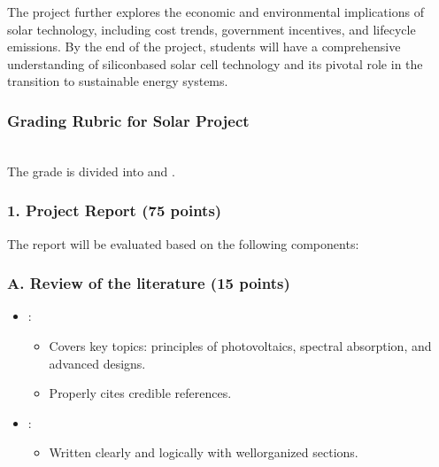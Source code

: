 \documentclass[letterpaper,10pt,english]{jupyterBook}
\begin{document}
\sphinxAtStartPar
The project further explores the economic and environmental implications
of solar technology, including cost trends, government incentives, and
lifecycle emissions. By the end of the project, students will have a
comprehensive understanding of silicon\sphinxhyphen{}based solar cell technology and
its pivotal role in the transition to sustainable energy systems.


\subsubsection{Grading Rubric for Solar Project}
\label{\detokenize{ProjectSyllabus:grading-rubric-for-solar-project}}
\sphinxAtStartPar
{}\\
The grade is divided into  and
.


\subsubsection{1. Project Report (75 points)}
\label{\detokenize{ProjectSyllabus:project-report-75-points}}
\sphinxAtStartPar
The report will be evaluated based on the following components:


\subsubsection{A. Review of the literature (15 points)}
\label{\detokenize{ProjectSyllabus:a-review-of-the-literature-15-points}}\begin{itemize}
\item {} 
\sphinxAtStartPar
{}:
\begin{itemize}
\item {} 
\sphinxAtStartPar
Covers key topics: principles of photovoltaics, spectral
absorption, and advanced designs.

\item {} 
\sphinxAtStartPar
Properly cites credible references.

\end{itemize}

\item {} 
\sphinxAtStartPar
{}:
\begin{itemize}
\item {} 
\sphinxAtStartPar
Written clearly and logically with well\sphinxhyphen{}organized sections.

\end{itemize}

\end{itemize}
\end{document}
